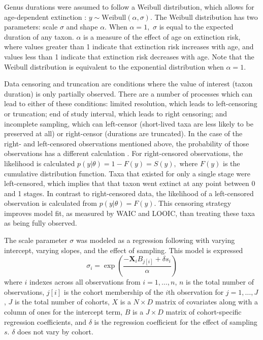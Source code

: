 \documentclass[11pt]{article}
\begin{document}
Genus durations were assumed to follow a Weibull distribution, which allows for age-dependent extinction \citep{Klein2003}: \(y \sim \mathrm{Weibull}(\alpha, \sigma)\). The Weibull distribution has two parameters: scale \(\sigma\) and shape \(\alpha\). When \(\alpha = 1,\) \(\sigma\) is equal to the expected duration of any taxon. \(\alpha\) is a measure of the effect of age on extinction risk, where values greater than 1 indicate that extinction risk increases with age, and values less than 1 indicate that extinction risk decreases with age. Note that the Weibull distribution is equivalent to the exponential distribution when \(\alpha = 1\). 

Data censoring and truncation are conditions where the value of interest (taxon duration) is only partially observed. There are a number of processes which can lead to either of these conditions: limited resolution, which leads to left-censoring or truncation; end of study interval, which leads to right censoring; and incomplete sampling, which can left-censor (short-lived taxa are less likely to be preserved at all) or right-censor (durations are truncated). In the case of the right- and left-censored observations mentioned above, the probability of those observations has a different calculation \citep{Klein2003}. For right-censored observations, the likelihood is calculated \(p(y | \theta) = 1 - F(y) = S(y),\) where \(F(y)\) is the cumulative distribution function. Taxa that existed for only a single stage were left-censored, which implies that that taxon went extinct at any point between 0 and 1 stages. In contrast to right-censored data, the likelihood of a left-censored observation is calculated from \(p(y | \theta) = F(y)\). This censoring strategy improves model fit, as measured by WAIC and LOOIC, than treating these taxa as being fully observed.

The scale parameter \(\sigma\) was modeled as a regression following \citet{Kleinbaum2005} with varying intercept, varying slopes, and the effect of sampling. This model is expressed
\begin{equation}
  \sigma_{i} = \exp\left(\frac{-\mathbf{X}_{i} B_{j[i]} + \delta s_{i}}{\alpha}\right)
  \label{eq:sigma}
\end{equation}
where \(i\) indexes across all observations from \(i = 1, \dots, n\), \(n\) is the total number of observations, \(j[i]\) is the cohort membership of the \(i\)th observation for \(j = 1, \dots, J\), \(J\) is the total number of cohorts, \(X\) is a \(N \times D\) matrix of covariates along with a column of ones for the intercept term, \(B\) is a \(J \times D\) matrix of cohort-specific regression coefficients, and \(\delta\) is the regression coefficient for the effect of sampling \(s\). \(\delta\) does not vary by cohort.
\end{document}
